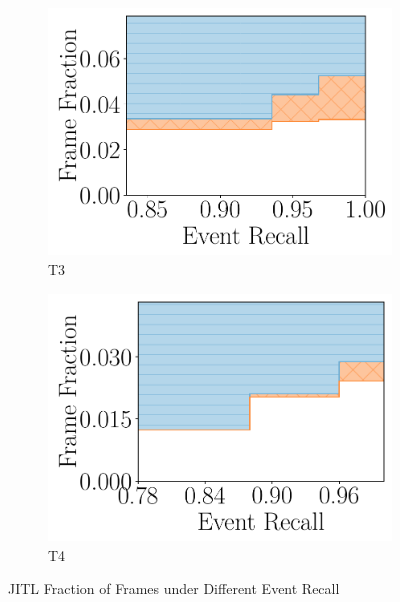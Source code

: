 \begin{figure}
    \vspace{.5in}

    \begin{subfigure}[b]{.48\linewidth}
    \centering
        \includegraphics[width=\linewidth]{FIGS/fig-jitl-raft-eventrecall-step.pdf}
    \caption{T3}
    \end{subfigure}
    \begin{subfigure}[b]{.48\linewidth}
    \centering
        \includegraphics[width=\linewidth]{FIGS/fig-jitl-elephant-eventrecall-step.pdf}
    \caption{T4}
    \end{subfigure}

    \vspace{.5in}
\caption{JITL Fraction of Frames under Different Event Recall}
\label{fig:jitl-eventrecall}
\end{figure}

